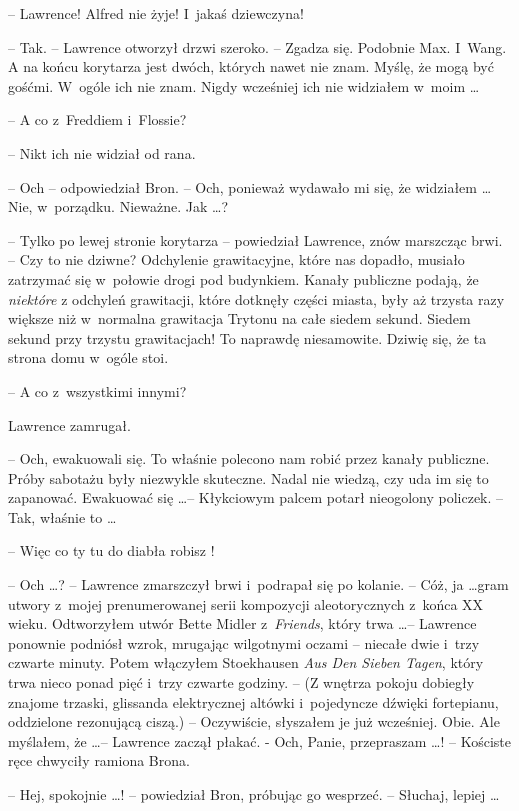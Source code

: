 \documentclass[oneside,polish,11pt,rmheadings]{mwbk}
\begin{document}
-- Lawrence! Alfred nie żyje! I~jakaś dziewczyna! 

-- Tak. -- Lawrence otworzył drzwi szeroko.  -- Zgadza się. Podobnie Max.  I~Wang. A na końcu korytarza jest dwóch, których nawet nie znam. Myślę, że mogą być gośćmi. W~ogóle ich nie znam. Nigdy wcześniej ich nie widziałem w~moim \ldots  

-- A co z~Freddiem i~Flossie? 

-- Nikt ich nie widział od rana. 

-- Och -- odpowiedział Bron. -- Och, ponieważ wydawało mi się, że widziałem \ldots  Nie, w~porządku. Nieważne. Jak \ldots ? 

-- Tylko po lewej stronie korytarza -- powiedział Lawrence, znów marszcząc brwi. -- Czy to nie dziwne? Odchylenie grawitacyjne, które nas dopadło, musiało zatrzymać się w~połowie drogi pod budynkiem. Kanały publiczne podają, że \textit{niektóre }z odchyleń grawitacji, które dotknęły części miasta, były aż trzysta razy większe niż w~normalna grawitacja Trytonu na  całe siedem sekund. Siedem sekund przy trzystu grawitacjach! To naprawdę niesamowite. Dziwię się, że ta strona domu w~ogóle stoi. 

-- A co z~wszystkimi innymi? 

Lawrence zamrugał. 

-- Och, ewakuowali się. To właśnie polecono nam robić przez kanały publiczne. Próby sabotażu były niezwykle skuteczne. Nadal nie wiedzą, czy uda im się to zapanować. Ewakuować się \ldots  -- Kłykciowym palcem potarł nieogolony policzek. -- Tak, właśnie to \ldots  

-- Więc co ty tu do diabła robisz ! 

-- Och  \ldots  ? -- Lawrence zmarszczył brwi i~podrapał się po kolanie. -- Cóż, ja \ldots   gram utwory z~mojej prenumerowanej serii kompozycji aleotorycznych z~końca XX wieku. Odtworzyłem utwór Bette Midler z~\textit{Friends}, który trwa \ldots  -- Lawrence ponownie podniósł wzrok, mrugając wilgotnymi oczami -- niecałe dwie i~trzy czwarte minuty. Potem włączyłem Stoekhausen \textit{Aus Den Sieben Tagen}, który trwa nieco ponad pięć i~trzy czwarte godziny. --  (Z wnętrza pokoju dobiegły znajome trzaski, glissanda elektrycznej altówki i~pojedyncze dźwięki fortepianu, oddzielone rezonującą ciszą.) -- Oczywiście, słyszałem je już wcześniej. Obie. Ale myślałem, że \ldots  -- Lawrence zaczął płakać.  - Och, Panie, przepraszam  \ldots ! -- Kościste ręce chwyciły ramiona Brona. 

-- Hej, spokojnie \ldots  ! -- powiedział Bron, próbując go wesprzeć. -- Słuchaj, lepiej  \ldots  
\end{document}
